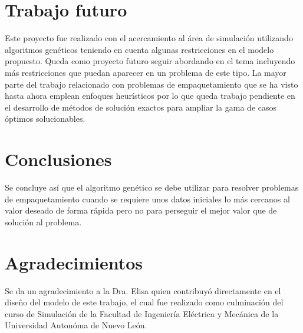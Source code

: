 \documentclass[3pt,twocolumn]{elsarticle}
\begin{document}
\section{Trabajo futuro}
Este proyecto fue realizado con el acercamiento al área de simulación utilizando algoritmos genéticos teniendo en cuenta algunas restricciones en el modelo propuesto. Queda como proyecto futuro seguir abordando en el tema incluyendo más restricciones que puedan aparecer en un problema de este tipo. La mayor parte del trabajo relacionado con problemas de empaquetamiento que se ha visto hasta ahora emplean enfoques heurísticos por lo que queda trabajo pendiente en el desarrollo de métodos de solución exactos para ampliar la gama de casos óptimos solucionables.

\section{Conclusiones}
Se concluye así que el algoritmo genético se debe utilizar para resolver problemas de empaquetamiento  cuando se requiere unos datos iniciales lo más cercanos al valor deseado de forma rápida pero no para perseguir el mejor valor que de solución al problema.

\section{Agradecimientos}
Se da un agradecimiento a la Dra. Elisa quien contribuyó directamente en el diseño del modelo de este trabajo, el cual fue realizado como culminación del curso de Simulación de la Facultad de Ingeniería Eléctrica y Mecánica de la Universidad Autonóma de Nuevo León.


\end{document}
